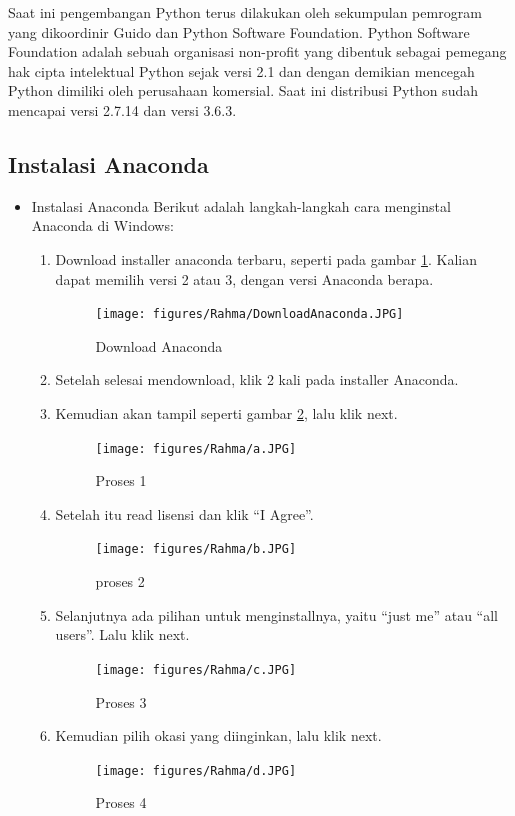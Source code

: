 Saat ini pengembangan Python terus dilakukan oleh sekumpulan pemrogram yang dikoordinir Guido dan Python Software Foundation. Python Software Foundation adalah sebuah organisasi non-profit yang dibentuk sebagai pemegang hak cipta intelektual Python sejak versi 2.1 dan dengan demikian mencegah Python dimiliki oleh perusahaan komersial. Saat ini distribusi Python sudah mencapai versi 2.7.14 dan versi 3.6.3.

\subsection{Instalasi Anaconda}
\begin{itemize}
\item Instalasi Anaconda
Berikut adalah langkah-langkah cara menginstal Anaconda di Windows:
\begin{enumerate}
\item Download installer anaconda terbaru, seperti pada gambar \ref{downloadanaconda}. Kalian dapat memilih versi 2 atau 3, dengan versi Anaconda berapa.
\begin{figure}[ht]
	\centerline{\texttt{[image: figures/Rahma/DownloadAnaconda.JPG]}}
	\caption{Download Anaconda}
	\label{downloadanaconda}
\end{figure}	
\item Setelah selesai mendownload, klik 2 kali pada installer Anaconda.
\item Kemudian akan tampil seperti gambar \ref{gambar1}, lalu klik next.
\begin{figure}[ht]
	\centerline{\texttt{[image: figures/Rahma/a.JPG]}}
	\caption{Proses 1 }
	\label{gambar1}
\end{figure}
\item Setelah itu read lisensi dan klik “I Agree”.
\begin{figure}[ht]
	\centerline{\texttt{[image: figures/Rahma/b.JPG]}}
	\caption{proses 2 }
	\label{gambar2 }
\end{figure}

\item Selanjutnya ada pilihan untuk menginstallnya, yaitu “just me” atau “all users”. Lalu klik next.
\begin{figure}[ht]
	\centerline{\texttt{[image: figures/Rahma/c.JPG]}}
	\caption{Proses 3 }
	\label{gambar3}
\end{figure}

\item Kemudian pilih okasi yang diinginkan, lalu klik next.
\begin{figure}[ht]
	\centerline{\texttt{[image: figures/Rahma/d.JPG]}}
	\caption{Proses 4 }
	\label{gambar4 }
\end{figure}


\end{enumerate}
\end{itemize}
